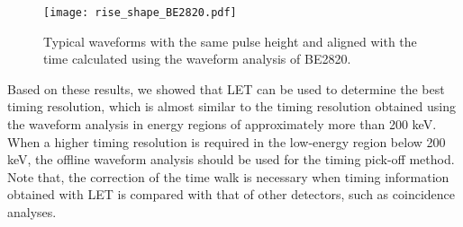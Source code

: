 \begin{figure}
  \centering
  \texttt{[image: rise\_shape\_BE2820.pdf]}
  \caption{Typical waveforms with the same pulse height and 
  aligned with the time calculated using the waveform analysis of BE2820.}
  \label{fig:rise_shape}
\end{figure}

Based on these results, we showed that LET can be used to determine the best timing resolution, which is almost similar to the timing resolution obtained using the waveform analysis in energy regions of approximately more than 200 keV. 
When a higher timing resolution is required in the low-energy region below 200 keV, the offline waveform analysis should be used for the timing pick-off method. 
Note that, the correction of the time walk is necessary when timing information obtained with LET is compared with that of other detectors, such as coincidence analyses.
